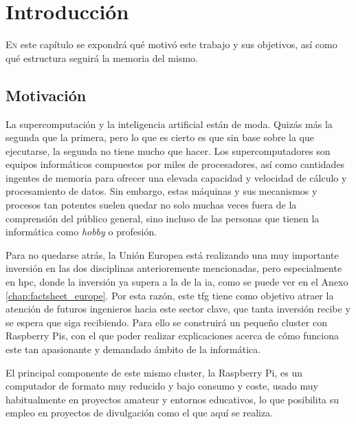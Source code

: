 \chapter{Introducción}
\label{chap:introducion}

\lettrine{E}{n} este capítulo se expondrá qué motivó este trabajo y sus objetivos, así como qué estructura seguirá la memoria del mismo.


\section{Motivación}
\label{sec:motivacion}

La supercomputación y la inteligencia artificial están de moda. Quizás más la segunda que la primera, pero lo que es cierto es que sin base sobre la que ejecutarse, la segunda no tiene mucho que hacer.
Los supercomputadores son equipos informáticos compuestos por miles de procesadores, así como cantidades ingentes de memoria para ofrecer una elevada capacidad y velocidad de cálculo y procesamiento de datos.
Sin embargo, estas máquinas y sus mecanismos y procesos tan potentes suelen quedar no solo muchas veces fuera de la comprensión del público general, sino incluso de las personas que tienen la informática como \textit{hobby} o profesión.

Para no quedarse atrás, la Unión Europea está realizando una muy importante inversión en las dos disciplinas anterioremente mencionadas, pero especialmente en \acrshort{hpc}, donde la inversión ya supera a la de la \acrshort{ia}, como se puede ver en el Anexo \ref{chap:factsheet_europe}.
Por esta razón, este \acrshort{tfg} tiene como objetivo atraer la atención de futuros ingenieros hacia este sector clave, que tanta inversión recibe y se espera que siga recibiendo. Para ello se construirá un pequeño cluster con Raspberry Pis, con el que poder realizar explicaciones acerca de cómo funciona este tan apasionante y demandado ámbito de la informática.

El principal componente de este mismo cluster, la Raspberry Pi, es un computador de formato muy reducido y bajo consumo y coste, usado muy habitualmente en proyectos amateur y entornos educativos, lo que posibilita su empleo en proyectos de divulgación como el que aquí se realiza.

